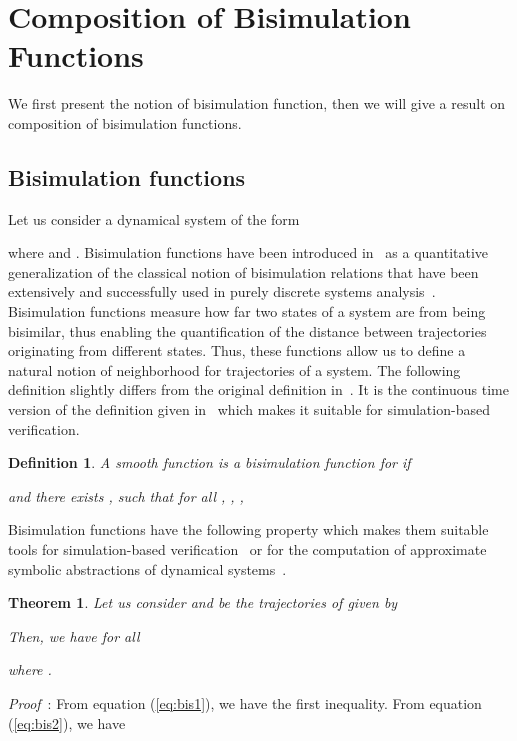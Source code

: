 \documentclass[a4paper,12pt,twoside]{article}
\newtheorem{theorem}{Theorem}
\newtheorem{definition}{Definition}
\begin{document}
\section{Composition of Bisimulation Functions}

We first present the notion of bisimulation function, then we will give a result on composition of bisimulation
functions.

\subsection{Bisimulation functions}

Let us consider a dynamical system of the form 

where  and .
Bisimulation functions have been introduced in~\cite{Girard2007}
as a quantitative generalization of the classical notion of
bisimulation relations that have been extensively and successfully
used in purely discrete systems analysis~\cite{Clarke99}. Bisimulation
functions measure how far two states of a system are from being
bisimilar, thus enabling the quantification of
the distance between trajectories originating from different states. 
Thus, these functions allow us to define a natural notion of neighborhood for trajectories of a system.
The following definition slightly differs from the original definition in~\cite{Girard2007}.
It is the continuous time version of the definition given in~\cite{Girard07a} which makes it suitable for simulation-based 
verification. 
\begin{definition} A smooth function  is a bisimulation function for  
if 

and there exists ,  such that for all , , ,

\end{definition}

Bisimulation functions have the following property which makes them suitable tools for simulation-based verification~\cite{Girard06,Girard07a,Julius07,Lerda08}
or for the computation of approximate symbolic abstractions of dynamical systems~\cite{Girard07,Pola07}.

\begin{theorem} Let us consider  and  be the trajectories of  given by

Then, we have for all 

where .
\end{theorem}

{\it Proof}~: From equation (\ref{eq:bis1}), we have the first inequality. From equation (\ref{eq:bis2}), we have
\end{document}
